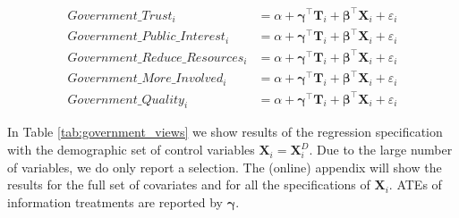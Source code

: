 \documentclass[11pt]{article}
\begin{document}
\begin{center}
\begin{align}
    \label{eq:governemnttrust}
    \text{$Government\_Trust_i$} 
    &= \alpha + \boldsymbol{\gamma}^{\top}\mathbf{T}_i + \boldsymbol{\beta}^{\top}\mathbf{X}_{i} + \varepsilon_{i} \\[0.25em]
    \text{$Government\_Public\_Interest_i$} 
    &= \alpha + \boldsymbol{\gamma}^{\top}\mathbf{T}_i + \boldsymbol{\beta}^{\top}\mathbf{X}_{i} +  \varepsilon_{i} \\[0.25em]
    \text{$Government\_Reduce\_Resources_i$} 
    &= \alpha + \boldsymbol{\gamma}^{\top}\mathbf{T}_i + \boldsymbol{\beta}^{\top}\mathbf{X}_{i} + \varepsilon_{i} \\[0.25em]
    \text{$Government\_More\_Involved_i$} 
    &= \alpha + \boldsymbol{\gamma}^{\top}\mathbf{T}_i + \boldsymbol{\beta}^{\top}\mathbf{X}_{i} + \varepsilon_{i} \\[0.25em]
    \label{eq:governemntquality}
    \text{$Government\_Quality_i$} 
    &= \alpha + \boldsymbol{\gamma}^{\top}\mathbf{T}_i + \boldsymbol{\beta}^{\top}\mathbf{X}_{i} + \varepsilon_{i} 
\end{align}
\end{center}

In Table \ref{tab:government_views} we show results of the regression specification with the demographic set of control variables $\mathbf{X}_{i} = \mathbf{X}_{i}^{D}$. Due to the large number of variables, we do only report a selection. The (online) appendix will show the results for the full set of covariates and for all the specifications of $\mathbf{X}_{i}$. ATEs of information treatments are reported by $\boldsymbol{\gamma}$.
\end{document}
